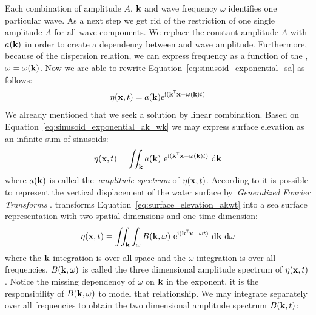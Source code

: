 Each combination of amplitude $A$, \wavevector $\mathbf{k}$ and wave frequency
$\omega$ identifies one particular wave. As a next step we get rid of the
restriction of one single amplitude $A$ for all wave components. We replace the
constant amplitude $A$ with $a(\mathbf{k})$ in order to create a dependency
between \wavevector and wave amplitude. Furthermore, because of the dispersion
relation, we can express frequency as a function of the \wavevector, $\omega =
\omega(\mathbf{k})$. Now we are able to rewrite
Equation~\ref{eq:sinusoid_exponential_sa} as follows:
\begin{equation}
\label{eq:sinusoid_exponential_ak_wk}
\eta(\mathbf{x}, t) =
a(\mathbf{k})\mathrm{e}^{\mathrm{i}(\mathbf{k}^{\mathsf{T}}\mathbf{x}-
\omega(\mathbf{k})t)}
\end{equation}
%
We already mentioned that we seek a solution by linear combination. Based on
Equation~\ref{eq:sinusoid_exponential_ak_wk} we may express surface
elevation as an infinite sum of sinusoids:
\begin{equation}
\label{eq:surface_elevation_akwt}
 \eta(\mathbf{x}, t) = \iint_{\mathbf{k}}
a(\mathbf{k})~\mathrm{e}^{\mathrm{i}(\mathbf{k}^{\mathsf{T}}\mathbf{x}-
\omega(\mathbf{k})t)}~\mathrm{d}\mathbf{k}
\end{equation}
where $a(\mathbf{k})$ is called the~\emph{amplitude spectrum} of
$\eta(\mathbf{x}, t)$.
According to \citet{book:kinsman2002wind} it is possible to
represent the vertical displacement of the water surface by~\emph{Generalized
Fourier Transforms} \citep{book:lighthill1958}.
\citeauthor{book:kinsman2002wind} transforms Equation~\ref{eq:surface_elevation_akwt}
into a sea surface representation with two spatial dimensions and one time dimension:
%
\begin{equation}
\label{eq:surface_elevation_bkwt}
 \eta(\mathbf{x}, t) = \iint_{\mathbf{k}}\int_{\omega} B(\mathbf{k},
\omega)~\mathrm{e}^{\mathrm{i}(\mathbf{k}^{\mathsf{T}}\mathbf{x}-
\omega t)}~
\mathrm{d}\mathbf{k}~\mathrm{d}\omega
\end{equation}
where the $\mathbf{k}$ integration is over all \wavenumber space and the $\omega$
integration is over all frequencies. $B(\mathbf{k},\omega)$ is called the
three dimensional amplitude spectrum of $\eta(\mathbf{x}, t)$. Notice the missing
dependency of $\omega$ on $\mathbf{k}$ in the exponent, it is the responsibility
of $B(\mathbf{k},\omega)$ to model that relationship.
We may integrate separately over all frequencies to obtain the two dimensional
amplitude spectrum $B(\mathbf{k}, t)$:
